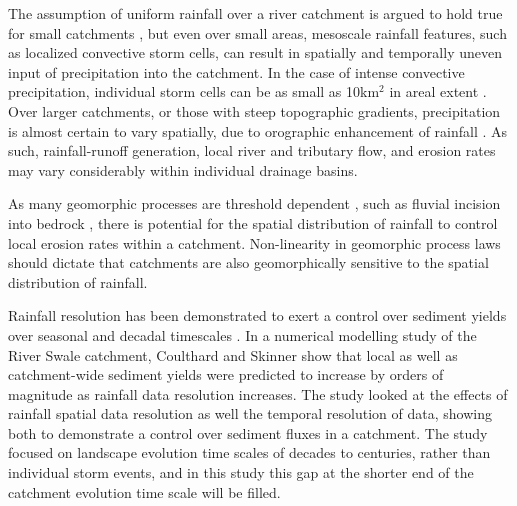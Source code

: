  The assumption of uniform rainfall over a river catchment is argued to hold true for small catchments \citep{Solyom2004,Tucker2010}, but even over small areas, mesoscale rainfall features, such as localized convective storm cells, can result in spatially and temporally uneven input of precipitation into the catchment. In the case of intense convective precipitation, individual storm cells can be as small as 10km$^2$ in areal extent  \citep{weisman1986characteristics,vonhardenberg2003shape}. Over larger catchments, or those with steep topographic gradients, precipitation is almost certain to vary spatially, due to orographic enhancement of rainfall \citep{Roe2003}. As such, rainfall-runoff generation, local river and tributary flow, and erosion rates may vary considerably within individual drainage basins. 
 
As many geomorphic processes are threshold dependent \citep{schumm1979geomorphic}, such as fluvial incision into bedrock \citep{sklar2001sediment,snyder2003importance}, there is potential for the spatial distribution of rainfall to control local erosion rates within a catchment. Non-linearity in geomorphic process laws \citep{coulthard1998non,phillips2003sources,coulthard2007cellular} should dictate that catchments are also geomorphically sensitive to the spatial distribution of rainfall. 

Rainfall resolution has been demonstrated to exert a control over sediment yields over seasonal and decadal timescales \citep{coulthard2016sensitivity}. In a numerical modelling study of the River Swale catchment, Coulthard and Skinner show that local as well as catchment-wide sediment yields were predicted to increase by orders of magnitude as rainfall data resolution increases. The study looked at the effects of rainfall spatial data resolution as well the temporal resolution of data, showing both to demonstrate a control over sediment fluxes in a catchment. The study focused on landscape evolution time scales of decades to centuries, rather than individual storm events, and in this study this gap at the shorter end of the catchment evolution time scale will be filled. 




